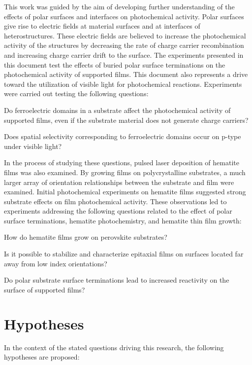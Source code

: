 This work was guided by the aim of developing further understanding of the effects of polar surfaces and interfaces on photochemical activity. Polar surfaces give rise to electric fields at material surfaces and at interfaces of heterostructures. These electric fields are believed to increase the photochemical activity of the structures by decreasing the rate of charge carrier recombination and increasing charge carrier drift to the surface. The experiments presented in this document test the effects of buried polar surface terminations on the photochemical activity of supported films. This document also represents a drive toward the utilization of visible light for photochemical reactions. Experiments were carried out testing the following questions:

\begin{items}

	\item Do ferroelectric domains in a substrate affect the photochemical activity of supported films, even if the substrate material does not generate charge carriers?
	\item Does spatial selectivity corresponding to ferroelectric domains occur on p-type  under visible light?
\end{items}

In the process of studying these questions, pulsed laser deposition of hematite  films was also examined. By growing films on polycrystalline substrates, a much larger array of orientation relationships between the substrate and film were examined. Initial photochemical experiments on hematite films suggested strong substrate effects on film photochemical activity. These observations led to experiments addressing the following questions related to the effect of polar surface terminations, hematite photochemistry, and hematite thin film growth:

\begin{items}
	\item How do hematite films grow on perovskite substrates?
	\item Is it possible to stabilize and characterize epitaxial films on surfaces located far away from low index orientations?
	\item Do polar substrate surface terminations lead to increased reactivity on the surface of supported films?
\end{items}

\section{Hypotheses}\label{sec:intro.hypotheses}
In the context of the stated questions driving this research, the following hypotheses are proposed:

